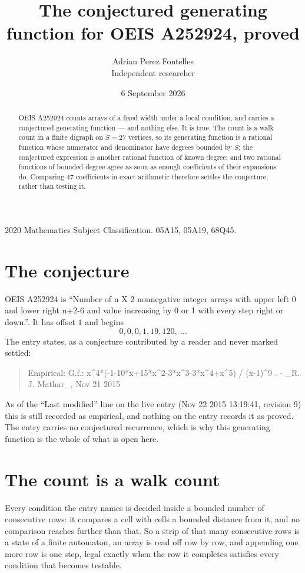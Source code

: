 \documentclass[11pt,a4paper]{article}
\title{The conjectured generating function for OEIS A252924, proved}
\author{Adrian Perez Fontelles\\ \small Independent researcher}
\date{6 September 2026}
\theoremstyle{plain}
\theoremstyle{definition}
\begin{document}
\maketitle

\begin{abstract}
OEIS A252924 counts arrays of a fixed width under a local condition, and carries a conjectured
generating function --- and nothing else. It is true. The count is a walk count in a finite
digraph on $S=27$ vertices, so its generating function is a rational function whose numerator
and denominator have degrees bounded by $S$; the conjectured expression is another rational
function of known degree; and two rational functions of bounded degree agree as soon as enough
coefficients of their expansions do. Comparing $47$ coefficients in exact arithmetic
therefore settles the conjecture, rather than testing it.
\end{abstract}

\noindent\small 2020 Mathematics Subject Classification. 05A15, 05A19, 68Q45.\normalsize

\section{The conjecture}

OEIS A252924 is ``Number of n X 2 nonnegative integer arrays with upper left 0 and lower right n+2-6 and value increasing by 0 or 1 with every step right or down.''. It has offset $1$ and begins
\[
0, 0, 0, 1, 19, 120,\ \dots
\]
The entry states, as a conjecture contributed by a reader and never marked settled:
\begin{quote}
Empirical: G.f.: x\^{}4*(-1-10*x+15*x\^{}2-3*x\^{}3-3*x\^{}4+x\^{}5) / (x-1)\^{}9 . - \_R. J. Mathar\_, Nov 21 2015
\end{quote}
As of the ``Last modified'' line on the live entry (Nov 22 2015 13:19:41, revision 9) this is still
recorded as empirical, and nothing on the entry records it as proved. The entry carries no
conjectured recurrence, which is why this generating function is the whole of what is open
here.

\section{The count is a walk count}

Every condition the entry names is decided inside a bounded number of consecutive rows: it
compares a cell with cells a bounded distance from it, and no comparison reaches further than
that. So a strip of that many consecutive rows is a state of a finite automaton, an array is
read off row by row, and appending one more row is one step, legal exactly when the row it
completes satisfies every condition that becomes testable.
\end{document}
